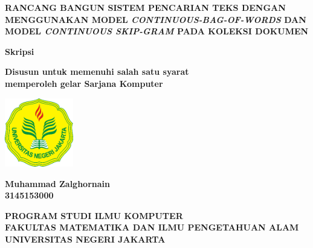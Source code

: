 \documentclass[12pt]{report}
\begin{document}
\begin{titlepage}
	\begin{center}
	\singlespacing
	\vspace*{1cm}
	\textbf{\fontsize{16pt}{\baselineskip}\selectfont
		RANCANG BANGUN SISTEM PENCARIAN TEKS DENGAN MENGGUNAKAN MODEL \textit{CONTINUOUS-BAG-OF-WORDS} DAN MODEL \textit{CONTINUOUS SKIP-GRAM} PADA KOLEKSI DOKUMEN}

	\vspace{1.8cm}
	\textbf{\fontsize{14pt}{\baselineskip}\selectfont 
		Skripsi}
        
	\vspace{1.8cm}
	\textbf{\fontsize{14pt}{\baselineskip}\selectfont
		Disusun untuk memenuhi salah satu syarat \\memperoleh gelar Sarjana Komputer}
            
	\vspace{1.8cm}

       	\includegraphics[width=3cm]{logounj}

	\vspace{1.5cm}
            
	\textbf{\fontsize{14pt}{\baselineskip}\selectfont
		Muhammad Zalghornain \\ 3145153000}
            
	\vspace{2.5cm}
     
	\textbf{\fontsize{13pt}{\baselineskip}\selectfont
	PROGRAM STUDI ILMU KOMPUTER\\
	FAKULTAS MATEMATIKA DAN ILMU PENGETAHUAN ALAM\\
	UNIVERSITAS NEGERI JAKARTA}
            
	\vspace{0.8cm}
	\textbf{\fontsize{12pt}{\baselineskip}}
	
	\end{center}
\end{titlepage}


\cleardoublepage
{}
{}

%
\end{document}

